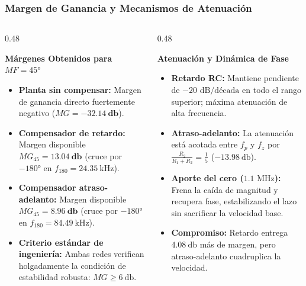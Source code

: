 \begin{frame}
  \frametitle{Margen de Ganancia y Mecanismos de Atenuación}

  \begin{columns}[t, onlytextwidth]
    \begin{column}{0.48\textwidth}
      \begin{tarjeta}
        {\fontsize{9pt}{11pt}\selectfont \textbf{\color{NavyDark} Márgenes Obtenidos para $MF = \ang{45}$}}\\[2pt]
        {\fontsize{7.5pt}{9.2pt}\selectfont
        \begin{itemize}\setlength{\itemsep}{2.5pt}
          \item \textbf{Planta sin compensar:}
          Margen de ganancia directo fuertemente negativo ($MG = \mathbf{-32.14\ \unit{\decibel}}$).
          \item \textbf{Compensador de retardo:}
          Margen disponible $MG_{45} = \mathbf{\qty{13.04}{\decibel}}$ (cruce por $\ang{-180}$ en $f_{180} = \qty{24.35}{\kilo\hertz}$).
          \item \textbf{Compensador atraso-adelanto:}
          Margen disponible $MG_{45} = \mathbf{\qty{8.96}{\decibel}}$ (cruce por $\ang{-180}$ en $f_{180} = \qty{84.49}{\kilo\hertz}$).
          \item \textbf{Criterio estándar de ingeniería:}
          Ambas redes verifican holgadamente la condición de estabilidad robusta: $MG \ge \qty{6}{\decibel}$.
        \end{itemize}
        }
      \end{tarjeta}
    \end{column}

    \begin{column}{0.48\textwidth}
      \begin{tarjeta}
        {\fontsize{9pt}{11pt}\selectfont \textbf{\color{NavyDark} Atenuación y Dinámica de Fase}}\\[2pt]
        {\fontsize{7.5pt}{9.2pt}\selectfont
        \begin{itemize}\setlength{\itemsep}{2.5pt}
          \item \textbf{Retardo RC:}
          Mantiene pendiente de $-20\text{ dB/década}$ en todo el rango superior; máxima atenuación de alta frecuencia.
          \item \textbf{Atraso-adelanto:}
          La atenuación está acotada entre $f_p$ y $f_z$ por $\frac{R_2}{R_1+R_2} = \frac{1}{5}$ ($\qty{-13.98}{\decibel}$).
          \item \textbf{Aporte del cero ($1.1\text{ MHz}$):}
          Frena la caída de magnitud y recupera fase, estabilizando el lazo sin sacrificar la velocidad base.
          \item \textbf{Compromiso:} Retardo entrega $\qty{4.08}{\decibel}$ más de margen, pero atraso-adelanto cuadruplica la velocidad.
        \end{itemize}
        }
      \end{tarjeta}
    \end{column}
  \end{columns}
\end{frame}

